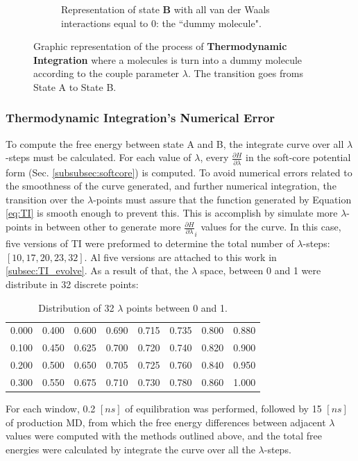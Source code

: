 \begin{figure}[h]
\begin{subfigure}[t]{0.45\textwidth}
    \caption{Representation of state \textbf{B} with all van der Waals interactions equal to 0: the ``dummy molecule".}
    \label{fig:StateB}
    \end{subfigure}
    \caption{Graphic representation of the process of \textbf{Thermodynamic Integration} where a molecules is turn into a dummy molecule according to the couple parameter $\lambda$. The transition goes froms State A to State B.}
    \label{fig:StateAB}
\end{figure}

\subsubsection{Thermodynamic Integration's Numerical Error}\label{subsubsec:TIerror1}
To compute the free energy between state A and B, the integrate curve over all $\lambda$-steps must be calculated. For each value of $\lambda$, every $\frac{\partial H}{\partial \lambda}$ in the soft-core potential form (Sec. \ref{subsubsec:softcore}) is computed. To avoid numerical errors related to the smoothness of the curve generated, and further numerical integration, the transition over the $\lambda$-points must assure that the function generated by Equation \ref{eq:TI} is smooth enough to prevent this.
This is accomplish by simulate more $\lambda$-points in between other to generate more $\frac{\partial H}{\partial \lambda}_i$ values for the curve. In this case, five versions of TI were preformed to determine the total number of $\lambda$-steps: $[10,17,20,23,32]$. Al five versions are attached to this work in \ref{subsec:TI_evolve}. As a result of that, the $\lambda$ space, between 0 and 1 were distribute in 32 discrete points: 

\begin{table}[th] %
    \centering
    \begin{tabular}{|c|c|c|c|c|c|c|c|}
    \toprule
         0.000 & 0.400 & 0.600 & 0.690 & 0.715 & 0.735 & 0.800 & 0.880 \\
         0.100 & 0.450 & 0.625 & 0.700 & 0.720 & 0.740 & 0.820 & 0.900 \\
         0.200 & 0.500 & 0.650 & 0.705 & 0.725 & 0.760 & 0.840 & 0.950 \\
         0.300 & 0.550 & 0.675 & 0.710 & 0.730 & 0.780 & 0.860 & 1.000 \\
    \bottomrule
    \end{tabular}
    \caption{Distribution of 32 $\lambda$ points between 0 and 1.}
    \label{table:l_points}
\end{table}

For each window, 0.2 $[ns]$ of equilibration was performed, followed by 15 $[ns]$ of production MD, from which the free energy diﬀerences between adjacent $\lambda$ values were computed with the methods outlined above, and the total free energies were calculated by integrate the curve over all the $\lambda$-steps. 

 